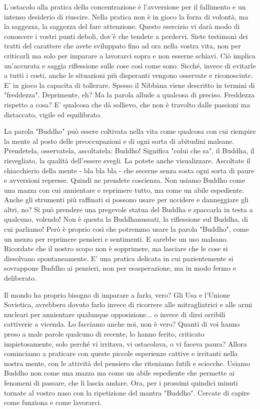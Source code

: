 L'ostacolo alla pratica della concentrazione è l'avversione per il
fallimento e un intenso desiderio di riuscire. Nella pratica non è in
gioco la forza di volontà, ma la saggezza, la saggezza del fare
attenzione. Questo esercizio vi darà modo di conoscere i vostri punti
deboli, dov'è che tendete a perdervi. Siete testimoni dei tratti del
carattere che avete sviluppato fino ad ora nella vostra vita, non per
criticarli ma solo per imparare a lavorarci sopra e non esserne schiavi.
Ciò implica un'accurata e saggia riflessione sulle cose così come sono.
Sicché, invece di evitarle a tutti i costi, anche le situazioni più
disperanti vengono osservate e riconosciute. E' in gioco la capacita di
tollerare. Spesso il Nibbāna viene descritto in termini di "freddezza".
Deprimente, eh? Ma la parola allude a qualcosa di preciso. Freddezza
rispetto a cosa? E' qualcosa che dà sollievo, che non è travolto dalle
passioni ma distaccato, vigile ed equilibrato.

La parola "Buddho" può essere coltivata nella vita come qualcosa con cui
riempire la mente al posto delle preoccupazioni e di ogni sorta di
abitudini malsane. Prendetela, osservatela, ascoltatela: Buddho!
Significa "colui che sa", il Buddha, il risvegliato, la qualità
dell'essere svegli. La potete anche visualizzare. Ascoltate il
chiacchierio della mente - bla bla bla - che secerne senza sosta ogni
sorta di paure e avversioni represse. Quindi ne prendete coscienza. Non
usiamo Buddho come una mazza con cui annientare e reprimere tutto, ma
come un abile espediente. Anche gli strumenti più raffinati si possono
usare per uccidere e danneggiare gli altri, no? Si può prendere una
pregevole statua del Buddha e spaccarla in testa a qualcuno, volendo!
Non è questa la Buddhanussati, la riflessione sul Buddha, di cui
parliamo! Però è proprio così che potremmo usare la parola "Buddho",
come un mezzo per reprimere pensieri e sentimenti. E sarebbe un uso
malsano. Ricordate che il nostro scopo non è sopprimere, ma lasciare che
le cose si dissolvano spontaneamente. E' una pratica delicata in cui
pazientemente si sovrappone Buddho ai pensieri, non per esasperazione,
ma in modo fermo e deliberato.

Il mondo ha proprio bisogno di imparare a farlo, vero? Gli Usa e
l'Unione Sovietica, avrebbero dovuto farlo invece di ricorrere alle
mitragliatrici e alle armi nucleari per annientare qualunque
opposizione... o invece di dirsi orribili cattiverie a vicenda. Lo
facciamo anche noi, non è vero? Quanti di voi hanno preso a male parole
qualcuno di recente, lo hanno ferito, criticato impietosamente, solo
perché vi irritava, vi ostacolava, o vi faceva paura? Allora cominciamo
a praticare con queste piccole esperienze cattive e irritanti nella
nostra mente, con le attività del pensiero che riteniamo futili e
sciocche. Usiamo Buddho non come una mazza ma come un abile espediente
che permette ai fenomeni di passare, che li lascia andare. Ora, per i
prossimi quindici minuti tornate al vostro naso con la ripetizione del
mantra "Buddho". Cercate di capire come funziona e come lavorarci.

